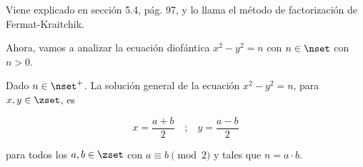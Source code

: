 

Viene explicado en \cite{burton} sección 5.4, pág. 97, y lo
llama el método de factorización de Fermat-Kraitchik.

Ahora, vamos a analizar la ecuación diofántica $x^2 - y^2 = n$ con $n \in
\nset$ con $n > 0$.

\begin{theorem}\label{th-sol-gral-ec-diof-cuad}
  Dado $n \in \nset^{+}$. La solución general de la ecuación $x^2 - y^2 =
  n$, para $x, y \in \zset$, es

  $$ x = \frac{a + b}{2} \quad \text{;} \quad y = \frac{a - b}{2} $$

  \noindent para todos los $a, b \in \zset$ con $a \equiv b \pmod 2$ y tales
  que $n = a \cdot b$.
\end{theorem}

